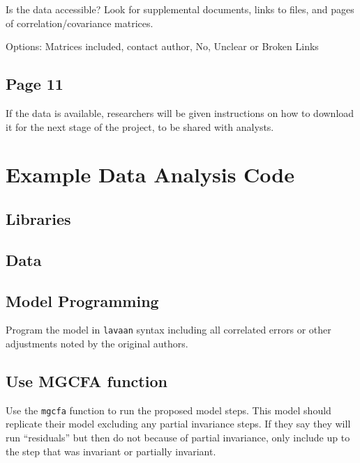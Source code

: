 \documentclass[
  man]{apa7}
\begin{document}
Is the data accessible? Look for supplemental documents, links to files, and pages of correlation/covariance matrices.

Options: Matrices included, contact author, No, Unclear or Broken Links

\hypertarget{page-11}{%
\subsection{Page 11}\label{page-11}}

If the data is available, researchers will be given instructions on how to download it for the next stage of the project, to be shared with analysts.

\hypertarget{example-data-analysis-code}{%
\section{Example Data Analysis Code}\label{example-data-analysis-code}}

\hypertarget{libraries}{%
\subsection{Libraries}\label{libraries}}

\hypertarget{data}{%
\subsection{Data}\label{data}}

\hypertarget{model-programming}{%
\subsection{Model Programming}\label{model-programming}}

Program the model in \texttt{lavaan} syntax including all correlated errors or other adjustments noted by the original authors.

\hypertarget{use-mgcfa-function}{%
\subsection{Use MGCFA function}\label{use-mgcfa-function}}

Use the \texttt{mgcfa} function to run the proposed model steps. This model should replicate their model excluding any partial invariance steps. If they say they will run ``residuals'' but then do not because of partial invariance, only include up to the step that was invariant or partially invariant.
\end{document}

